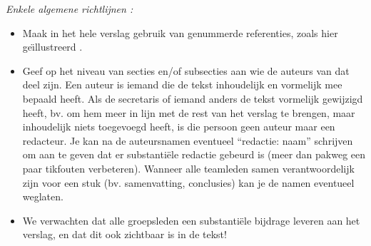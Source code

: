\em Enkele algemene richtlijnen : 
\begin{itemize}
\item Maak in het hele verslag gebruik van genummerde referenties, zoals hier ge\"\i llustreerd \cite{website:wikibooks-biblio}.  
\item Geef op het niveau van secties en/of subsecties aan wie de auteurs van dat deel zijn.  Een auteur is iemand die de tekst inhoudelijk en vormelijk mee bepaald heeft.    Als de secretaris of iemand anders de tekst vormelijk gewijzigd heeft, bv. om hem meer in lijn met de rest van het verslag te brengen, maar inhoudelijk niets toegevoegd heeft, is die persoon geen auteur maar een redacteur.  Je kan na de auteursnamen eventueel ``redactie: naam'' schrijven om aan te geven dat er substanti\"ele redactie gebeurd is (meer dan pakweg een paar tikfouten verbeteren).  Wanneer alle teamleden samen verantwoordelijk zijn voor een stuk (bv. samenvatting, conclusies) kan je de namen eventueel weglaten.
\item We verwachten dat alle groepsleden een substanti\"ele bijdrage leveren aan het  verslag, en dat dit ook zichtbaar is in de tekst!
\end{itemize}